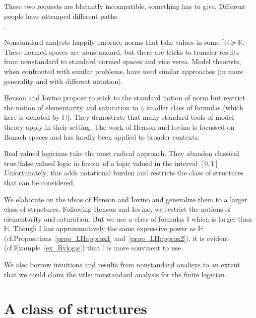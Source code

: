 \documentclass[11pt,oneside]{amsart}
\newcommand{\mylabel}[1]{{#1}\hfill}
\renewenvironment{itemize}
  {\begin{list}{$\cdot$}{%
  \setlength{\parskip}{0mm}
  \setlength{\topsep}{.2\baselineskip}
  \setlength{\rightmargin}{0mm}
  \setlength{\listparindent}{0mm}
  \setlength{\itemindent}{0mm}
  \setlength{\labelwidth}{3ex}
  \setlength{\itemsep}{.2\baselineskip}
  \setlength{\parsep}{.2\baselineskip}
  \setlength{\partopsep}{0mm}
  \setlength{\labelsep}{1ex}
  \setlength{\leftmargin}{\labelwidth+\labelsep}
  \let\makelabel\mylabel}}{%
\end{list}}
\begin{document}
These two requests are blatantly incompatible, something has to give.
Different people have attemped different paths.
\begin{itemize}
  \item[1.] Nonstandard analysts happily embrace norms that take values in some ${}^*\mathds{R}\succeq\mathds{R}$.
  These normed spaces are nonstandard, but there are tricks to transfer results from nonstandard to standard normed spaces and vice versa.
  Model theorists, when confronted with similar problems, have used similar approaches (in more generality and with different notation).
  \item[2.] Henson and Iovino propose to stick to the standard notion of norm but restrict the notion of elementarity and saturation to a smaller class of formulas (which here is denoted by $\mathds{H}$).
  They demostrate that many standard tools of model theory apply in their setting. 
  The work of Henson and Iovino is focussed on Banach spaces and has hardly been applied to broader contexts.
  \item[3.] Real valued logicians take the most radical approach.
  They abandon classical true/false valued logic in favour of a logic valued in the interval $[0,1]$.
  Unfortunately, this adds notational burden and restricts the class of structures that can be considered.
\end{itemize}

We elaborate on the ideas of Henson and Iovino and generalize them to a larger class of structures.
Following Henson and Iovino, we restrict the notions of elementarity and saturation.
But we use a class of formulas $\mathds{I}$ which is larger than $\mathds{H}$.
Though $\mathds{I}$ has approximatively the same expressive power as $\mathds{H}$ (cf.\@ Propositions~\ref{prop_LHapprox1} and~\ref{prop_LHapprox2}), it is evident (cf.\@ Example~\ref{ex_Rvlogic}) that $\mathds{I}$ is more convinent to use.

We also borrow intuitions and results from nonstandard analisys to an extent that we could claim the title: nonstandard analysis for the finite logician.


\section{A class of structures}\label{uno}
\end{document}

